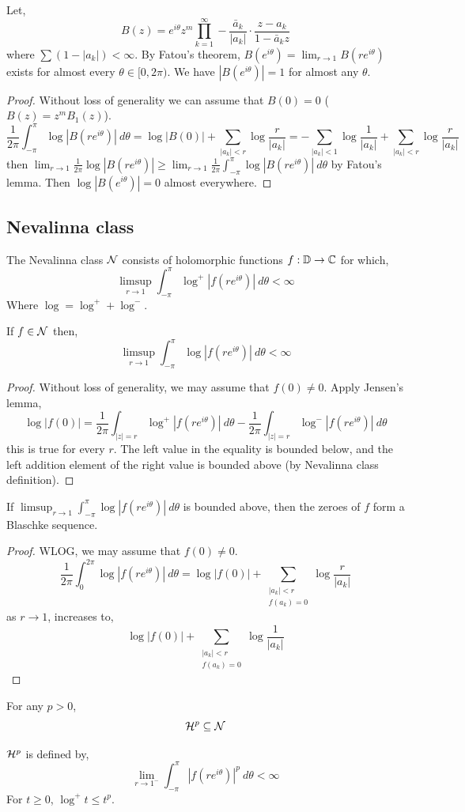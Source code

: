 \begin{theorem}
	Let,
	\[
		B(z)
		= e^{i \theta} z^m \prod_{k = 1}^\infty -\frac{\bar{a}_k}{|a_k|} \cdot \frac{z - a_k}{1 - \bar{a}_k z}
	\]
	where $\sum (1 - |a_k|) < \infty$.
	By Fatou's theorem, $B(e^{i \theta}) = \lim_{r \to 1} B(r e^{i \theta})$ exists for almost every $\theta \in [0, 2 \pi)$.
	We have $|B(e^{i \theta})| = 1$ for almost any $\theta$.
\end{theorem}
\begin{proof}
	Without loss of generality we can assume that $B(0) = 0$ ($B(z) = z^m B_1(z)$).
	\[
		\frac{1}{2 \pi} \int_{-\pi}^{\pi} \log |B(r e^{i \theta})|\ d \theta
		= \log |B(0)| + \sum_{|a_k| < r} \log \frac{r}{|a_k|}
		= -\sum_{|a_k| < 1} \log \frac{1}{|a_k|} + \sum_{|a_k| < r} \log \frac{r}{|a_k|}
	\]
	then $\lim_{r \to 1} \frac{1}{2 \pi} \log |B(r e^{i \theta})| \ge \lim_{r \to 1} \frac{1}{2 \pi} \int_{-\pi}^{\pi} \log |B(r e^{i \theta})|\ d \theta$ by Fatou's lemma.
	Then $\log |B(e^{i \theta})| = 0$ almost everywhere.
\end{proof}

\subsection{Nevalinna class}
The Nevalinna class $\mathcal{N}$ consists of holomorphic functions $f : \mathbb{D} \to \mathbb{C}$ for which,
\[
	\limsup_{r \to 1} \int_{-\pi}^{\pi} \log^+ |f(r e^{i \theta})|\ d \theta
	< \infty
\]
Where $\log = \log^+ + \log^-$.
\begin{lemma}
	If $f \in \mathcal{N}$ then,
	\[
		\limsup_{r \to 1} \int_{-\pi}^{\pi} \log |f(r e^{i \theta})|\ d \theta
		< \infty
	\]
\end{lemma}
\begin{proof}
	Without loss of generality, we may assume that $f(0) \ne 0$.
	Apply Jensen's lemma,
	\[
		\log |f(0)|
		= \frac{1}{2 \pi} \int_{|z| = r} \log^+ |f(r e^{i \theta})|\ d \theta - \frac{1}{2 \pi} \int_{|z| = r} \log^- |f(r e^{i \theta})|\ d \theta
	\]
	this is true for every $r$.
	The left value in the equality is bounded below, and the left addition element of the right value is bounded above (by Nevalinna class definition).
\end{proof}
\begin{lemma}
	If $\limsup_{r \to 1} \int_{-\pi}^{\pi} \log |f(r e^{i \theta})|\ d \theta$ is bounded above, then the zeroes of $f$ form a Blaschke sequence.
\end{lemma}
\begin{proof}
	WLOG, we may assume that $f(0) \ne 0$.
	\[
		\frac{1}{2 \pi} \int_{0}^{2 \pi} \log |f(r e^{i \theta})|\ d \theta
		= \log |f(0)| + \sum_{\substack{|a_k| < r \\ f(a_k) = 0}} \log \frac{r}{|a_k|}
	\]
	as $r \to 1$, increases to,
	\[
		\log |f(0)| + \sum_{\substack{|a_k| < r \\ f(a_k) = 0}} \log \frac{1}{|a_k|}
	\]
\end{proof}
\begin{theorem}
	For any $p > 0$,
	\[
		\mathcal{H}^p \subseteq \mathcal{N}
	\]
\end{theorem}
$\mathcal{H}^p$ is defined by,
\[
	\lim_{r \to 1^-} \int_{-\pi}^{\pi} {| f(r e^{i \theta}) |}^p\ d \theta
	< \infty
\]
For $t \ge 0$, $\log^+ t \le t^p$.

\listoftheorems[title=theorems \& definitions,ignoreall,show={theorem,definition},swapnumber,onlynamed={proposition}]

